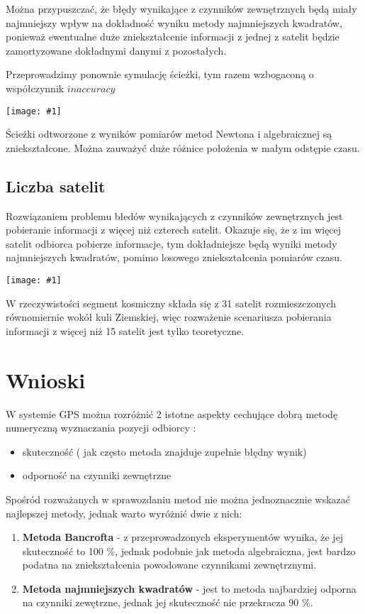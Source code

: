 \documentclass{article}
\newcommand{\plot}[1] {
	\texttt{[image: \#1]}
}
\begin{document}
\par Można przypuszczać, że błędy wynikające z czynników zewnętrznych będą miały najmniejszy wpływ na dokładność wyniku metody najmniejszych kwadratów, ponieważ ewentualne duże zniekształcenie informacji z jednej z satelit będzie zamortyzowane dokładnymi danymi z pozostałych. 

\par Przeprowadzimy ponownie symulację ścieżki, tym razem wzbogaconą o współczynnik $inaccuracy$

\plot{sciezkipraktyczneall.png}

Ścieżki odtworzone z wyników pomiarów metod Newtona i algebraicznej są zniekształcone. Można zauważyć duże różnice położenia w małym odstępie czasu.

\subsection{Liczba satelit}

Rozwiązaniem problemu błedów wynikających z czynników zewnętrznych jest pobieranie informacji z więcej niż czterech satelit. Okazuje się, że z im więcej satelit odbiorca pobierze informacje, tym dokładniejsze będą wyniki metody najmniejszych kwadratów, pomimo losowego zniekształcenia pomiarów czasu.

\plot{liczbasatelit.png}

W rzeczywistości segment kosmiczny składa się z 31 satelit rozmieszczonych równomiernie wokół kuli Ziemskiej, więc rozważenie scenariusza pobierania informacji z więcej niż 15 satelit jest tylko teoretyczne.

\section{Wnioski}

W systemie GPS można rozróżnić 2 istotne aspekty cechujące dobrą metodę numeryczną wyznaczania pozycji odbiorcy :
\begin{itemize}
	\item skuteczność ( jak często metoda znajduje zupełnie błędny wynik)
	\item odporność na czynniki zewnętrzne
\end{itemize}

Spośród rozważanych w sprawozdaniu metod nie można jednoznacznie wskazać najlepszej metody, jednak warto wyróżnić dwie z nich:
\begin{enumerate}
	\item \textbf{Metoda Bancrofta} - z przeprowadzonych eksperymentów wynika, że jej skuteczność to 100 \%, jednak podobnie jak metoda algebraiczna, jest bardzo podatna na zniekształcenia powodowane czynnikami zewnętrznymi.
	\item \textbf{Metoda najmniejszych kwadratów} - jest to metoda najbardziej odporna na czynniki zewętrzne, jednak jej skuteczność nie przekracza 90 \%.
\end{enumerate}
\end{document}
